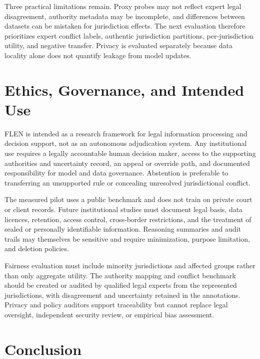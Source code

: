 \documentclass[preprint,12pt,authoryear]{elsarticle}
\begin{document}
Three practical limitations remain. Proxy probes may not reflect expert legal disagreement, authority metadata may be incomplete, and differences between datasets can be mistaken for jurisdiction effects. The next evaluation therefore prioritizes expert conflict labels, authentic jurisdiction partitions, per-jurisdiction utility, and negative transfer. Privacy is evaluated separately because data locality alone does not quantify leakage from model updates.

\section{Ethics, Governance, and Intended Use}

FLEN is intended as a research framework for legal information processing and decision support, not as an autonomous adjudication system. Any institutional use requires a legally accountable human decision maker, access to the supporting authorities and uncertainty record, an appeal or override path, and documented responsibility for model and data governance. Abstention is preferable to transferring an unsupported rule or concealing unresolved jurisdictional conflict.

The measured pilot uses a public benchmark and does not train on private court or client records. Future institutional studies must document legal basis, data licences, retention, access control, cross-border restrictions, and the treatment of sealed or personally identifiable information. Reasoning summaries and audit trails may themselves be sensitive and require minimization, purpose limitation, and deletion policies.

Fairness evaluation must include minority jurisdictions and affected groups rather than only aggregate utility. The authority mapping and conflict benchmark should be created or audited by qualified legal experts from the represented jurisdictions, with disagreement and uncertainty retained in the annotations. Privacy and policy auditors support traceability but cannot replace legal oversight, independent security review, or empirical bias assessment.

\section{Conclusion}
\end{document}
